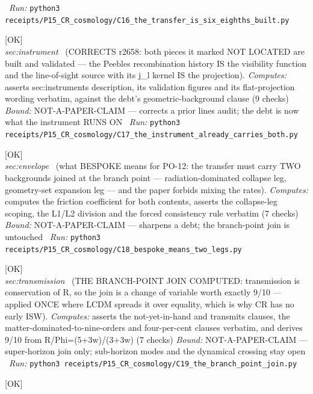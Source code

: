 \begin{description}
\ \emph{Run:} \texttt{python3 receipts/P15\_CR\_cosmology/C16\_the\_transfer\_is\_six\_eighths\_built.py}
\item[\label{rcpt:C17_the_instrument_already_carries_both}\texttt{C17\_the\_instrument\_already\_carries\_both}]\hfill\textsf{[OK]}\\
\textit{sec:instrument} \ (CORRECTS r2658: both pieces it marked NOT LOCATED are built and validated --- the Peebles recombination history IS the visibility function and the line-of-sight source with its j\_l kernel IS the projection). 
\emph{Computes:} asserts sec:instruments description, its validation figures and its flat-projection wording verbatim, against the debt's geometric-background clause (9 checks)
 \emph{Bound:} NOT-A-PAPER-CLAIM --- corrects a prior lines audit; the debt is now what the instrument RUNS ON
\ \emph{Run:} \texttt{python3 receipts/P15\_CR\_cosmology/C17\_the\_instrument\_already\_carries\_both.py}
\item[\label{rcpt:C18_bespoke_means_two_legs}\texttt{C18\_bespoke\_means\_two\_legs}]\hfill\textsf{[OK]}\\
\textit{sec:envelope} \ (what BESPOKE means for PO-12: the transfer must carry TWO backgrounds joined at the branch point --- radiation-dominated collapse leg, geometry-set expansion leg --- and the paper forbids mixing the rates). 
\emph{Computes:} computes the friction coefficient for both contents, asserts the collapse-leg scoping, the L1/L2 division and the forced consistency rule verbatim (7 checks)
 \emph{Bound:} NOT-A-PAPER-CLAIM --- sharpens a debt; the branch-point join is untouched
\ \emph{Run:} \texttt{python3 receipts/P15\_CR\_cosmology/C18\_bespoke\_means\_two\_legs.py}
\item[\label{rcpt:C19_the_branch_point_join}\texttt{C19\_the\_branch\_point\_join}]\hfill\textsf{[OK]}\\
\textit{sec:transmission} \ (THE BRANCH-POINT JOIN COMPUTED: transmission is conservation of R, so the join is a change of variable worth exactly 9/10 --- applied ONCE where LCDM spreads it over equality, which is why CR has no early ISW). 
\emph{Computes:} asserts the not-yet-in-hand and transmits clauses, the matter-dominated-to-nine-orders and four-per-cent clauses verbatim, and derives 9/10 from R/Phi=(5+3w)/(3+3w) (7 checks)
 \emph{Bound:} NOT-A-PAPER-CLAIM --- super-horizon join only; sub-horizon modes and the dynamical crossing stay open
\ \emph{Run:} \texttt{python3 receipts/P15\_CR\_cosmology/C19\_the\_branch\_point\_join.py}
\item[\label{rcpt:C20_the_caveat_named_an_empty_set}\texttt{C20\_the\_caveat\_named\_an\_empty\_set}]\hfill\textsf{[OK]}\\

\end{description}
